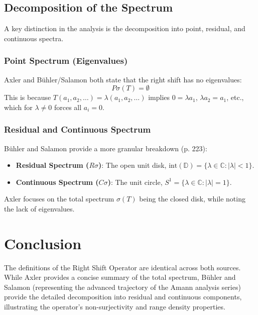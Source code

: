 \documentclass{article}
\begin{document}
\subsection{Decomposition of the Spectrum}
A key distinction in the analysis is the decomposition into point, residual, and continuous spectra.

\subsubsection{Point Spectrum (Eigenvalues)}
Axler and Bühler/Salamon both state that the right shift has no eigenvalues:
\[ P\sigma(T) = \emptyset \]
This is because $T(a_1, a_2, \dots) = \lambda (a_1, a_2, \dots)$ implies $0 = \lambda a_1$, $\lambda a_2 = a_1$, etc., which for $\lambda \neq 0$ forces all $a_i = 0$.

\subsubsection{Residual and Continuous Spectrum}
Bühler and Salamon provide a more granular breakdown (p. 223):
\begin{itemize}
    \item \textbf{Residual Spectrum ($R\sigma$)}: The open unit disk, $\text{int}(\mathbb{D}) = \{ \lambda \in \mathbb{C} : |\lambda| < 1 \}$.
    \item \textbf{Continuous Spectrum ($C\sigma$)}: The unit circle, $S^1 = \{ \lambda \in \mathbb{C} : |\lambda| = 1 \}$.
\end{itemize}
Axler focuses on the total spectrum $\sigma(T)$ being the closed disk, while noting the lack of eigenvalues.

\section{Conclusion}
The definitions of the Right Shift Operator are identical across both sources. While Axler provides a concise summary of the total spectrum, Bühler and Salamon (representing the advanced trajectory of the Amann analysis series) provide the detailed decomposition into residual and continuous components, illustrating the operator's non-surjectivity and range density properties.
\end{document}
